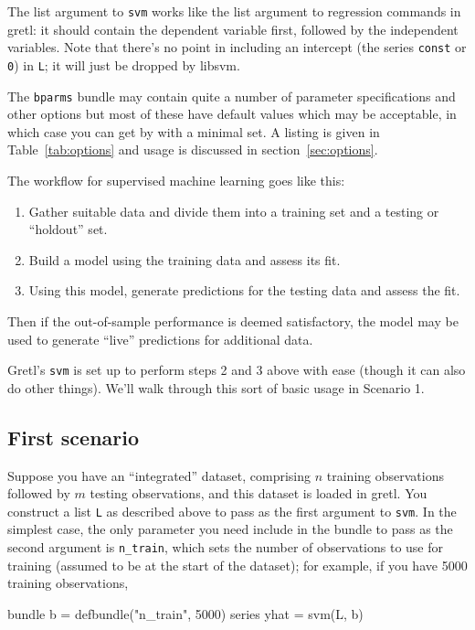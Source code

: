 \documentclass{article}
\begin{document}
The list argument to \texttt{svm} works like the list argument to
regression commands in gretl: it should contain the dependent variable
first, followed by the independent variables. Note that there's no
point in including an intercept (the series \texttt{const} or
\texttt{0}) in \texttt{L}; it will just be dropped by \textsf{libsvm}.

The \texttt{bparms} bundle may contain quite a number of parameter
specifications and other options but most of these have default
values which may be acceptable, in which case you can get by with a
minimal set.  A listing is given in Table~\ref{tab:options} and usage
is discussed in section~\ref{sec:options}.

The workflow for supervised machine learning goes like this:
\begin{enumerate}
\item Gather suitable data and divide them into a training set and a
  testing or ``holdout'' set.
\item Build a model using the training data and assess its fit.
\item Using this model, generate predictions for the testing data and
  assess the fit.
\end{enumerate}

Then if the out-of-sample performance is deemed satisfactory, the
model may be used to generate ``live'' predictions for additional
data.

Gretl's \texttt{svm} is set up to perform steps 2 and 3 above with
ease (though it can also do other things). We'll walk through this
sort of basic usage in Scenario 1.

\subsection{First scenario}
\label{sec:s1}

Suppose you have an ``integrated'' dataset, comprising $n$ training
observations followed by $m$ testing observations, and this dataset is
loaded in gretl. You construct a list \texttt{L} as described above to
pass as the first argument to \texttt{svm}. In the simplest case, the
only parameter you need include in the bundle to pass as the second
argument is \texttt{n\_train}, which sets the number of observations
to use for training (assumed to be at the start of the dataset); for
example, if you have 5000 training observations,
\begin{code}
bundle b = defbundle("n_train", 5000)
series yhat = svm(L, b)
\end{code}
\end{document}
